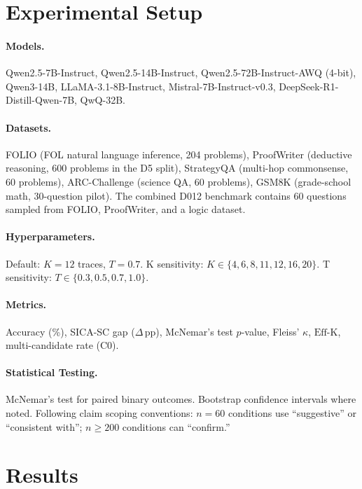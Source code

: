 \documentclass[11pt,a4paper]{article}
\newcommand{\effk}{\text{Eff-K}}
\begin{document}
\section{Experimental Setup}
\label{sec:setup}

\paragraph{Models.} Qwen2.5-7B-Instruct, Qwen2.5-14B-Instruct, Qwen2.5-72B-Instruct-AWQ (4-bit), Qwen3-14B, LLaMA-3.1-8B-Instruct, Mistral-7B-Instruct-v0.3, DeepSeek-R1-Distill-Qwen-7B, QwQ-32B.

\paragraph{Datasets.} FOLIO (FOL natural language inference, 204 problems), ProofWriter (deductive reasoning, 600 problems in the D5 split), StrategyQA (multi-hop commonsense, 60 problems), ARC-Challenge (science QA, 60 problems), GSM8K (grade-school math, 30-question pilot). The combined D012 benchmark contains 60 questions sampled from FOLIO, ProofWriter, and a logic dataset.

\paragraph{Hyperparameters.} Default: $K=12$ traces, $T=0.7$. K sensitivity: $K \in \{4, 6, 8, 11, 12, 16, 20\}$. T sensitivity: $T \in \{0.3, 0.5, 0.7, 1.0\}$.

\paragraph{Metrics.} Accuracy (\%), SICA-SC gap ($\Delta$\,pp), McNemar's test $p$-value, Fleiss' $\kappa$, $\effk$, multi-candidate rate (C0).

\paragraph{Statistical Testing.} McNemar's test for paired binary outcomes. Bootstrap confidence intervals where noted. Following claim scoping conventions: $n=60$ conditions use ``suggestive'' or ``consistent with''; $n \geq 200$ conditions can ``confirm.''


\section{Results}
\label{sec:results}
\end{document}
